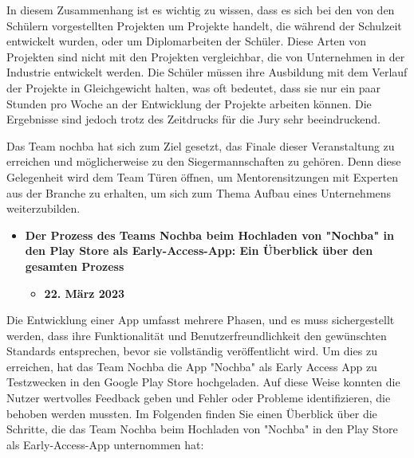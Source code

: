 In diesem Zusammenhang ist es wichtig zu wissen, dass es sich bei den von den Schülern vorgestellten Projekten um Projekte handelt, die während der Schulzeit entwickelt wurden, oder um Diplomarbeiten der Schüler. Diese Arten von Projekten sind nicht mit den Projekten vergleichbar, die von Unternehmen in der Industrie entwickelt werden. Die Schüler müssen ihre Ausbildung mit dem Verlauf der Projekte in Gleichgewicht halten, was oft bedeutet, dass sie nur ein paar Stunden pro Woche an der Entwicklung der Projekte arbeiten können. Die Ergebnisse sind jedoch trotz des Zeitdrucks für die Jury sehr beeindruckend.

Das Team nochba hat sich zum Ziel gesetzt, das Finale dieser Veranstaltung zu erreichen und möglicherweise zu den Siegermannschaften zu gehören. Denn diese Gelegenheit wird dem Team Türen öffnen, um Mentorensitzungen mit Experten aus der Branche zu erhalten, um sich zum Thema Aufbau eines Unternehmens weiterzubilden.



\begin{itemize}
    \item \textbf{Der Prozess des Teams Nochba beim Hochladen von "Nochba" in den Play Store als Early-Access-App: Ein Überblick über den gesamten Prozess}
    \begin{itemize}
        \item \textbf{22. März 2023}
    \end{itemize}
\end{itemize}

Die Entwicklung einer App umfasst mehrere Phasen, und es muss sichergestellt werden, dass ihre Funktionalität und Benutzerfreundlichkeit den gewünschten Standards entsprechen, bevor sie vollständig veröffentlicht wird. Um dies zu erreichen, hat das Team Nochba die App "Nochba" als Early Access App zu Testzwecken in den Google Play Store hochgeladen. Auf diese Weise konnten die Nutzer wertvolles Feedback geben und Fehler oder Probleme identifizieren, die behoben werden mussten. Im Folgenden finden Sie einen Überblick über die Schritte, die das Team Nochba beim Hochladen von "Nochba" in den Play Store als Early-Access-App unternommen hat:

